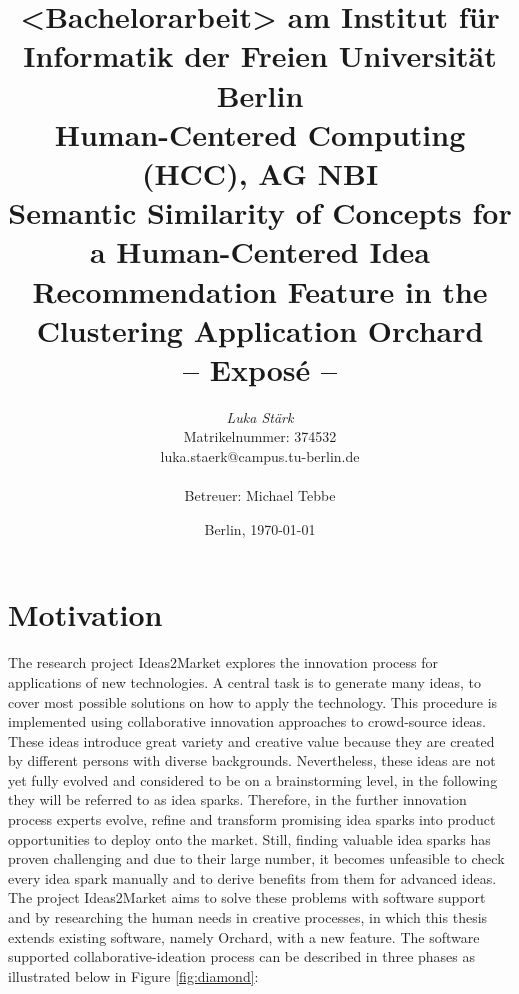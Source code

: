 \documentclass[pdftex,a4paper,12pt]{scrartcl}
\title{
{\small <Bachelorarbeit> am Institut für Informatik der Freien Universität Berlin}\\
{\small Human-Centered Computing (HCC), AG NBI}\\
[6ex]
{\LARGE Semantic Similarity of Concepts for a Human-Centered Idea Recommendation Feature in the Clustering Application Orchard}\\
{\normalsize-- Exposé --}}
\author{
{\emph{\normalsize Luka Stärk}}\\
{\normalsize Matrikelnummer: 374532}\\
{\normalsize luka.staerk@campus.tu-berlin.de}\\\\
{\normalsize Betreuer: Michael Tebbe}
}
\date{\normalsize Berlin, \today}
\theoremstyle{definition}
\newcommand{\blankpage}{
\newpage
\thispagestyle{empty}
\mbox{}
\newpage
}
\begin{document}
\maketitle 



\thispagestyle{empty}  %
\blankpage

\setcounter{page}{1} %


\section{Motivation} 
    
The research project Ideas2Market explores the innovation process for applications of new technologies. A central task is to generate many ideas, to cover most possible solutions on how to apply the technology. This procedure is implemented using collaborative innovation approaches to crowd-source ideas. These ideas introduce great variety and creative value because they are created by different persons with diverse backgrounds. Nevertheless, these ideas are not yet fully evolved and considered to be on a brainstorming level, in the following they will be referred to as idea sparks. Therefore, in the further innovation process experts evolve, refine and transform promising idea sparks into product opportunities to deploy onto the market. Still, finding valuable idea sparks has proven challenging and due to their large number, it becomes unfeasible to check every idea spark manually and to derive benefits from them for advanced ideas. The project Ideas2Market aims to solve these problems with software support and by researching the human needs in creative processes, in which this thesis extends existing software, namely Orchard, with a new feature. The software supported collaborative-ideation process can be described in three phases as illustrated below in Figure \ref{fig:diamond}: 
\end{document}
